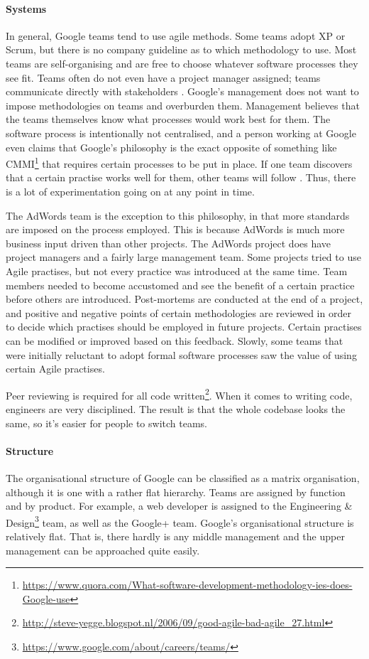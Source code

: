 \paragraph{Systems}
In general, Google teams tend to use agile methods. Some teams adopt XP or Scrum, but there is no company guideline as to which methodology to use. Most teams are self-organising and are free to choose whatever software processes they see fit. Teams often do not even have a project manager assigned; teams communicate directly with stakeholders \citep{striebeck2006ssh}. Google's management does not want to impose methodologies on teams and overburden them. Management believes that the teams themselves know what processes would work best for them. The software process is intentionally not centralised, and a person working at Google even claims that Google's philosophy is the exact opposite of something like CMMI\footnote{\url{https://www.quora.com/What-software-development-methodology-ies-does-Google-use}} that requires certain processes to be put in place. If one team discovers that a certain practise works well for them, other teams will follow \citep{striebeck2006ssh}. Thus, there is a lot of experimentation going on at any point in time.

The AdWords team is the exception to this philosophy, in that more standards are imposed on the process employed. This is because AdWords is much more business input driven than other projects. The AdWords project does have project managers and a fairly large management team. Some projects tried to use Agile practises, but not every practice was introduced at the same time. Team members needed to become accustomed and see the benefit of a certain practice before others are introduced. Post-mortems are conducted at the end of a project, and positive and negative points of certain methodologies are reviewed in order to decide which practises should be employed in future projects. Certain practises can be modified or improved based on this feedback. Slowly, some teams that were initially reluctant to adopt formal software processes saw the value of using certain Agile practises.

Peer reviewing is required for all code written\footnote{\url{http://steve-yegge.blogspot.nl/2006/09/good-agile-bad-agile_27.html}}. When it comes to writing code, engineers are very disciplined. The result is that the whole codebase looks the same, so it's easier for people to switch teams.

\paragraph{Structure}
The organisational structure of Google can be classified as a matrix organisation, although it is one with a rather flat hierarchy. Teams are assigned by function and by product. For example, a web developer is assigned to the Engineering \& Design\footnote{\url{https://www.google.com/about/careers/teams/}} team, as well as the Google+ team. Google's organisational structure is relatively flat. That is, there hardly is any middle management and the upper management can be approached quite easily.

